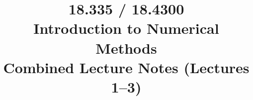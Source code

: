 \documentclass[12pt]{article}
\begin{document}
\title{18.335 / 18.4300 \\ Introduction to Numerical Methods \\
       Combined Lecture Notes (Lectures 1--3)}
\author{}
\date{}
\maketitle

\tableofcontents
\newpage

\end{document}
